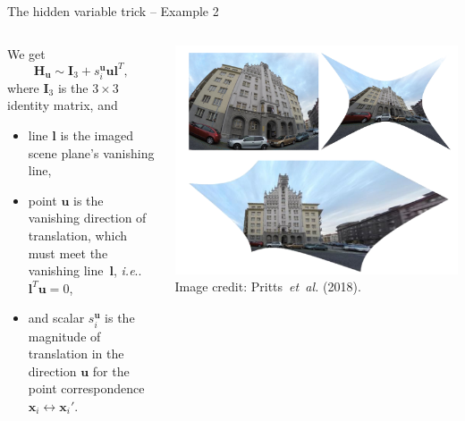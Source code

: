 \documentclass[aspectratio=169]{beamer}
\makeatletter
\newcommand{\etal}{\emph{et~al.}}
\newcommand{\mat}[1]{\bm{#1}}
\newcommand{\T}{T}
\DeclareRobustCommand\etal{\emph{et~al}\@ifnextchar.{}{.\@}}
\DeclareRobustCommand\ie{\emph{i.e}\@ifnextchar.{}{.\@}}
\makeatother
\begin{document}
\begin{frame}[t]{The hidden variable trick -- Example 2}
\begin{columns}
    \begin{column}{0.5\textwidth}
        \begin{minipage}[t][\textheight][t]{\textwidth}
        \hiddenvariableTwoeHeight
        We get
        \begin{equation*}
        \mat{H_u} \sim \mat{I}_3+s_i^{\mat{u}}\mat{ul}^\T,
        \end{equation*}
        where $\mat{I}_3$ is the $3\times 3$ identity matrix, and
        \begin{itemize}
        \item line $\mat{l}$ is the imaged scene plane’s vanishing line,
        \item point $\mat{u}$ is the vanishing direction of translation, which must meet the vanishing
              line~$\mat{l}$, \ie{} $\mat{l}^\T\mat{u} = 0$,
        \item and scalar $s_i^{\mat{u}}$ is the magnitude of translation in the direction $\mat{u}$ for
              the point correspondence $\mat{x}_i\leftrightarrow\mat{x}_i'$.
        \end{itemize}
        \end{minipage}
    \end{column}%
    \begin{column}{0.5\textwidth}
        \centering
        \includegraphics[width=\linewidth]{images/conjugate_trans.png}
        {\scriptsize Image credit: Pritts~\etal{} (2018).}
    \end{column}
\end{columns}
\end{frame}
\end{document}
